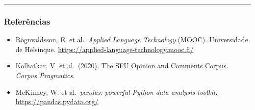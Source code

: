 \documentclass[
  brazilian,
  11pt,
]{article}
\providecommand{\tightlist}{%
  \setlength{\itemsep}{0pt}\setlength{\parskip}{0pt}}
\begin{document}
\begin{center}\rule{0.5\linewidth}{0.5pt}\end{center}

\subsubsection{Referências}\label{referuxeancias}

\begin{itemize}
\tightlist
\item
  Rögnvaldsson, E. et al.~\emph{Applied Language Technology} (MOOC).
  Universidade de Helsinque.
  \url{https://applied-language-technology.mooc.fi/}
\item
  Kolhatkar, V. et al.~(2020). The SFU Opinion and Comments Corpus.
  \emph{Corpus Pragmatics}.
\item
  McKinney, W. et al.~\emph{pandas: powerful Python data analysis
  toolkit}. \url{https://pandas.pydata.org/}
\end{itemize}
\end{document}
